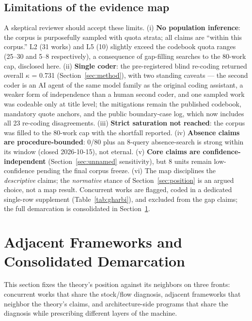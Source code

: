 \documentclass[10pt]{article}
\begin{document}
\subsection{Limitations of the evidence map}\label{sec:maplimits}

A skeptical reviewer should accept these limits. (i) \textbf{No population inference}: the corpus is purposefully sampled with quota strata; all claims are ``within this corpus.'' L2 (31 works) and L5 (10) slightly exceed the codebook quota ranges (25--30 and 5--8 respectively), a consequence of gap-filling searches to the 80-work cap, disclosed here. (ii) \textbf{Single coder}: the pre-registered blind re-coding returned overall $\kappa$ = 0.731 (Section~\ref{sec:method}), with two standing caveats --- the second coder is an AI agent of the same model family as the original coding assistant, a weaker form of independence than a human second coder, and one sampled work was codeable only at title level; the mitigations remain the published codebook, mandatory quote anchors, and the public boundary-case log, which now includes all 23 re-coding disagreements. (iii) \textbf{Strict saturation not reached}: the corpus was filled to the 80-work cap with the shortfall reported. (iv) \textbf{Absence claims are procedure-bounded}: 0/80 plus an 8-query absence-search is strong within its window (closed 2026-10-15), not eternal. (v) \textbf{Core claims are confidence-independent} (Section~\ref{sec:unnamed} sensitivity), but 8 units remain low-confidence pending the final corpus freeze. (vi) The map disciplines the \emph{descriptive} claims; the \emph{normative} stance of Section~\ref{sec:position} is an argued choice, not a map result. Concurrent works are flagged, coded in a dedicated single-row supplement (Table~\ref{tab:gharbi}), and excluded from the gap claims; the full demarcation is consolidated in Section~\ref{sec:concurrent}.

\section{Adjacent Frameworks and Consolidated Demarcation}\label{sec:concurrent}

This section fixes the theory's position against its neighbors on three fronts: concurrent works that share the stock/flow diagnosis, adjacent frameworks that neighbor the theory's claims, and architecture-side programs that share the diagnosis while prescribing different layers of the machine.
\end{document}
